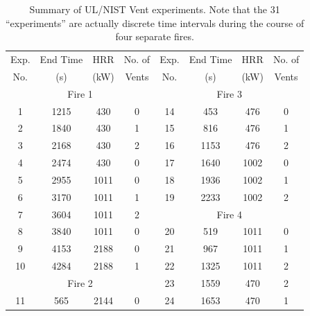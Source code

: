 \begin{table}[h!]
\centering
\caption[Summary of UL/NIST Vent experiments]{Summary of UL/NIST Vent experiments. Note that the 31 ``experiments'' are actually discrete time intervals during the course of four separate fires.}
\begin{tabular}{|c|c|c|c||c|c|c|c|}
\hline
Exp.    & End Time  & HRR           &  No. of   & Exp.    & End Time  & HRR           &  No. of           \\
No.     & (s)       & (kW)          & Vents     & No.     & (s)       & (kW)          & Vents             \\ \hline \hline
\multicolumn{4}{|c||}{Fire 1}                   & \multicolumn{4}{|c|}{Fire 3}                            \\ \hline
1       & 1215      & 430           & 0         & 14      & 453       & 476           & 0                 \\ \hline
2       & 1840      & 430           & 1         & 15      & 816       & 476           & 1                 \\ \hline
3       & 2168      & 430           & 2         & 16      & 1153      & 476           & 2                 \\ \hline
4       & 2474      & 430           & 0         & 17      & 1640      & 1002          & 0                 \\ \hline
5       & 2955      & 1011          & 0         & 18      & 1936      & 1002          & 1                 \\ \hline
6       & 3170      & 1011          & 1         & 19      & 2233      & 1002          & 2                 \\ \hline
7       & 3604      & 1011          & 2         & \multicolumn{4}{|c|}{Fire 4}                            \\ \hline
8       & 3840      & 1011          & 0         & 20      & 519       & 1011          & 0                 \\ \hline
9       & 4153      & 2188          & 0         & 21      & 967       & 1011          & 1                 \\ \hline
10      & 4284      & 2188          & 1         & 22      & 1325      & 1011          & 2                 \\ \hline
\multicolumn{4}{|c||}{Fire 2}                   & 23      & 1559      & 470           & 2                 \\ \hline
11      & 565       & 2144          & 0         & 24      & 1653      & 470           & 1                 \\ \hline

\end{tabular}
\end{table}
